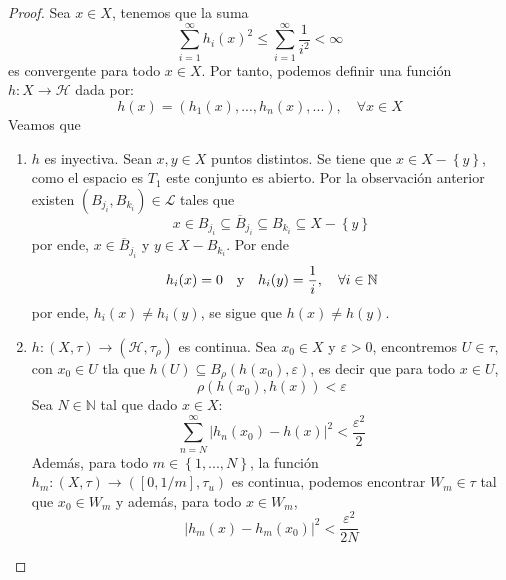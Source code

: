 \documentclass[12pt]{report}
\theoremstyle{largebreak}
\newcommand\abs[1]{\ensuremath{\left|#1\right|}}
\newcommand\cf[3]{\ensuremath{#1:#2\rightarrow#3}}
\begin{document}
\begin{proof}
        Sea $x\in X$, tenemos que la suma
        \begin{equation*}
            \sum_{ i=1}^\infty h_i(x)^2\leq\sum_{ i=1}^\infty\frac{1}{i^2} <\infty
        \end{equation*}
        es convergente para todo $x\in X$. Por tanto, podemos definir una función $\cf{h}{X}{\mathcal{H}}$ dada por:
        \begin{equation*}
            h(x)=(h_1(x),...,h_n(x),...),\quad\forall x\in X
        \end{equation*}
        Veamos que
        \begin{enumerate}
            \item $h$ es inyectiva. Sean $x,y\in X$ puntos distintos. Se tiene que $x\in X-\left\{y\right\}$, como el espacio es $T_1$ este conjunto es abierto. Por la observación anterior existen $(B_{ j_i},B_{ k_i})\in\mathcal{L}$ tales que
            \begin{equation*}
                x\in B_{ j_i}\subseteq\overline{B}_{ j_i}\subseteq B_{ k_i}\subseteq X-\left\{y\right\}
            \end{equation*}
            por ende, $x\in\overline{B}_{ j_i}$ y $y\in X-B_{ k_i}$. Por ende
            \begin{equation*}
                h_i(x)=0\quad\textup{y}\quad h_i(y)=\frac{1}{i},\quad\forall i\in\mathbb{N}
            \end{equation*}
            por ende, $h_i(x)\neq h_i(y)$, se sigue que $h(x)\neq h(y)$.
            \item $\cf{h}{(X,\tau)}{(\mathcal{H},\tau_{\rho})}$ es continua. Sea $x_0\in X$ y $\varepsilon>0$, encontremos $U\in\tau$, con $x_0\in U$ tla que $h(U)\subseteq B_\rho(h(x_0),\varepsilon)$, es decir que para todo $x\in U$,
            \begin{equation*}
                \rho(h(x_0),h(x))<\varepsilon
            \end{equation*}
            Sea $N\in\mathbb{N}$ tal que dado $x\in X$:
            \begin{equation*}
                \sum_{ n=N}^\infty\abs{ h_n(x_0)-h(x)}^2<\frac{\varepsilon^2}{2}
            \end{equation*}
            Además, para todo $m\in\left\{1,...,N \right\}$, la función $\cf{h_m}{(X,\tau)}{([0,1/m],\tau_u)}$ es continua, podemos encontrar $W_m\in\tau$ tal que $x_0\in W_m$ y además, para todo $x\in W_m$,
            \begin{equation*}
                \abs{h_m(x)-h_m(x_0)}^2<\frac{\varepsilon^2}{2N}

\end{equation*}
\end{enumerate}
\end{proof}
\end{document}
